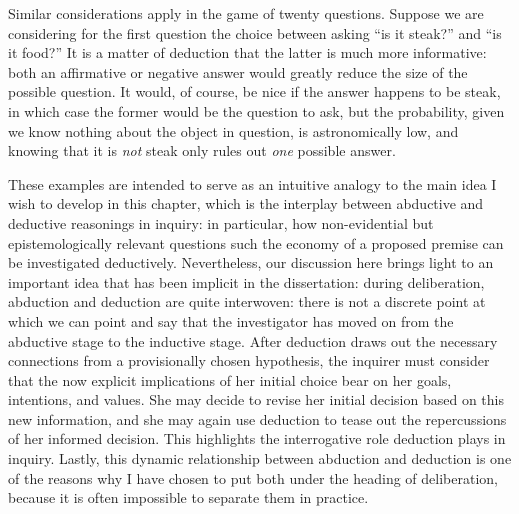  Similar considerations apply in the game of twenty questions. Suppose we are considering for the first question the choice between asking ``is it steak?'' and ``is it food?'' It is a matter of deduction that the latter is much more informative: both an affirmative or negative answer would greatly reduce the size of the possible question. It would, of course, be nice if the answer happens to be steak, in which case the former would be the question to ask, but the probability, given we know nothing about the object in question, is astronomically low, and knowing that it is \emph{not} steak only rules out \emph{one} possible answer. 

These examples are intended to serve as an intuitive analogy to the main idea I wish to develop in this chapter, which is the interplay between abductive and deductive reasonings in inquiry: in particular, how non-evidential but epistemologically relevant questions such the economy of a proposed premise can be investigated deductively. Nevertheless, our discussion here brings light to an important idea that has been implicit in the dissertation: during deliberation, abduction and deduction are quite interwoven: there is not a discrete point at which we can point and say that the investigator has moved on from the abductive stage to the inductive stage. After deduction draws out the necessary connections from a provisionally chosen hypothesis, the inquirer must consider that the now explicit implications of her initial choice bear on her goals, intentions, and values. She may decide to revise her initial decision based on this new information, and she may again use deduction to tease out the repercussions of her informed decision. This highlights the interrogative role deduction plays in inquiry. Lastly, this dynamic relationship between abduction and deduction is one of the reasons why I have chosen to put both under the heading of deliberation, because it is often impossible to separate them in practice.      	
%
%



